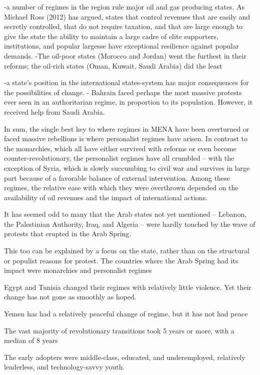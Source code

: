 -a number of regimes in the region rule major oil and gas producing states. As Michael Ross (2012) has argued, states that control revenues that are easily and secretly controlled, that do not require taxation, and that are large enough to give the state the ability to maintain a large cadre of elite supporters, institutions, and popular largesse have exceptional resilience against popular demands.
    -The oil-poor states (Morocco and Jordan) went the furthest in their reforms; the oil-rich states (Oman, Kuwait, Saudi Arabia) did the least
    
-a state’s position in the international states-system has major consequences for the possibilities of change.
    - Bahrain faced perhaps the most massive protests ever seen in an authoritarian regime, in proportion to its population. However, it received help from Saudi Arabia.

In sum, the single best key to where regimes in MENA have been overturned or faced massive rebellions is where personalist regimes have arisen. In contrast to the monarchies, which all have either survived with reforms or even become counter-revolutionary, the personalist regimes have all crumbled – with the exception of Syria, which is slowly succumbing to civil war and survives in large part because of a favorable balance of external intervention.
Among these regimes, the relative ease with which they were overthrown depended on the availability of oil revenues and the impact of international actions.


It has seemed odd to many that the Arab states not yet mentioned – Lebanon, the Palestinian Authority, Iraq, and Algeria – were hardly touched by the wave of protests that erupted in the Arab Spring.

This too can be explained by a focus on the state, rather than on the structural or populist reasons for protest. The countries where the Arab Spring had its impact were monarchies and personalist regimes

Egypt and Tunisia changed their regimes with relatively little violence. Yet their change has not gone as smoothly as hoped.

Yemen has had a relatively peaceful change of regime, but it has not had peace

The vast majority of revolutionary transitions took 5 years or more, with a median of 8 years

\cite{hussein_what_2013}

The early adopters were middle-class, educated, and underemployed, relatively leaderless, and technology-savvy youth.

